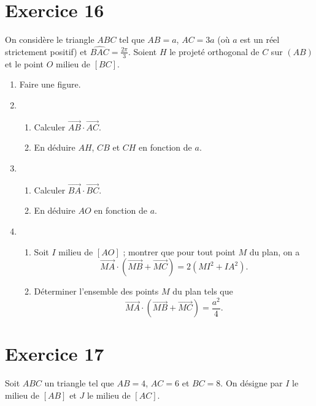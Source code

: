 \documentclass[12pt]{article}
\begin{document}
\section*{Exercice 16}

On considère le triangle $ABC$ tel que $AB = a$, $AC = 3a$ (où $a$ est un réel strictement positif) et $\widehat{BAC} = \frac{2\pi}{3}$.  
Soient $H$ le projeté orthogonal de $C$ sur $(AB)$ et le point $O$ milieu de $[BC]$.

\begin{enumerate}
    \item Faire une figure.

    \item 
    \begin{enumerate}
        \item Calculer $\overrightarrow{AB} \cdot \overrightarrow{AC}$.
        \item En déduire $AH$, $CB$ et $CH$ en fonction de $a$.
    \end{enumerate}

    \item 
    \begin{enumerate}
        \item Calculer $\overrightarrow{BA} \cdot \overrightarrow{BC}$.
        \item En déduire $AO$ en fonction de $a$.
    \end{enumerate}

    \item 
    \begin{enumerate}
        \item Soit $I$ milieu de $[AO]$ ; montrer que pour tout point $M$ du plan, on a 
        \[
        \overrightarrow{MA} \cdot (\overrightarrow{MB} + \overrightarrow{MC}) = 2(MI^2 + IA^2).
        \]

        \item Déterminer l’ensemble des points $M$ du plan tels que 
        \[
        \overrightarrow{MA} \cdot (\overrightarrow{MB} + \overrightarrow{MC}) = \frac{a^2}{4}.
        \]
    \end{enumerate}
\end{enumerate}
\section*{Exercice 17}

Soit $ABC$ un triangle tel que $AB = 4$, $AC = 6$ et $BC = 8$. On désigne par $I$ le milieu de $[AB]$ et $J$ le milieu de $[AC]$.
\end{document}
